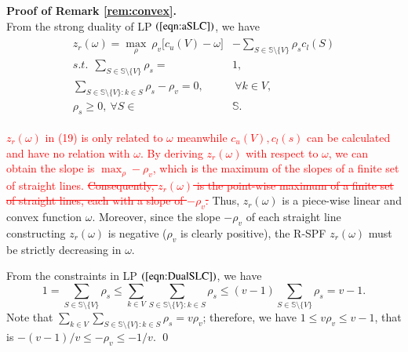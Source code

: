 \documentclass[authoryear,review,12pt]{elsarticle}
\begin{document}
\noindent \textbf{Proof of Remark \ref{rem:convex}.}\\
From the strong duality of LP $(\ref{eqn:aSLC})$, we have
\begin{eqnarray}\label{eqn:DualSLC}
\begin{aligned}
z_r(\omega) = \max_{\rho}~ \rho_v \big[ c_u(V)-\omega \big] &- \sum_{S \in \mathbb{S} \setminus \{V\}} \rho_s c_l(S)\\
s.t.~~\sum_{S \in \mathbb{S} \setminus \{V\}} \rho_s = &1,\\
\sum_{S \in \mathbb{S} \setminus \{V\}: k \in S} \rho_s - \rho_v = 0,&~\forall k \in V,\\
\rho_s \geq 0,~\forall S \in& \mathbb{S}.
\end{aligned}
\end{eqnarray}

\textcolor{red}{$z_r(\omega)$ in (19) is only related to $\omega$ meanwhile $c_u(V), c_l(s)$ can be calculated and have no relation with $\omega$. By deriving $z_r(\omega)$ with respect to $\omega$, we can obtain the slope is $\max_\rho -\rho_v$, which is the maximum of the slopes of a finite set of straight lines.} \textcolor{red}{\st{Consequently, $z_r(\omega)$ is the point-wise maximum of a finite set of straight lines, each with a slope of $-\rho_v$.
}}
Thus, $z_r(\omega)$ is a piece-wise linear and convex function  $\omega$.
Moreover, since the slope $-\rho_v$ of each straight line constructing $z_r(\omega)$ is negative ($\rho_v$ is clearly positive), the R-SPF $z_r(\omega)$ must be strictly decreasing in $\omega$.

From the constraints in LP $(\ref{eqn:DualSLC})$, we have
$$
1 = \sum_{S \in \mathbb{S} \setminus \{V\}} \rho_s \leq \sum_{k \in V}\sum_{S \in \mathbb{S} \setminus \{V\}: k \in S} \rho_s \leq (v-1)\sum_{S \in \mathbb{S} \setminus \{V\}} \rho_s = v-1.
$$
Note that $\sum_{k \in V}\sum_{S \in \mathbb{S} \setminus \{V\}: k \in S} \rho_s = v\rho_v$; therefore, we have $1 \leq v\rho_v \leq v-1$, that is $-(v-1)/v\leq -\rho_v \leq -1/v$.
\qed
\end{document}
